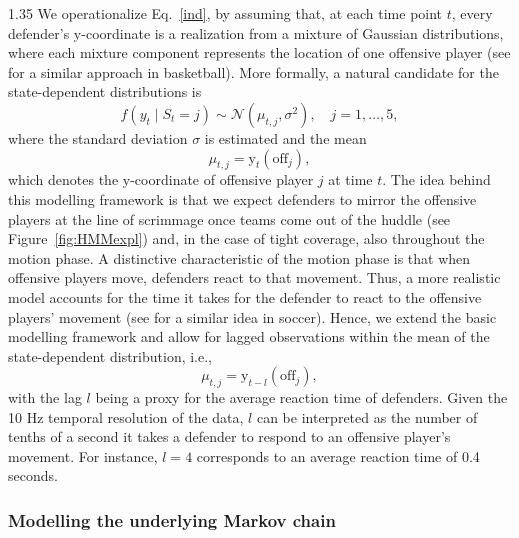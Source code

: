 \documentclass[12pt,a4paper]{article}
\begin{document}
\begin{spacing}{1.35}
We operationalize Eq.~\ref{ind}, by assuming that, at each time point $t$, every defender's $\mathrm{y}$-coordinate is a realization from a mixture of Gaussian distributions, where each mixture component represents the location of one offensive player (see \citealp{franks2015} for a similar approach in basketball). 
More formally, a natural candidate for the state-dependent distributions is
\begin{equation}
\label{eqn:state_dep}
  f(y_t \mid S_t = j) \sim \mathcal{N}(\mu_{t,j}, \sigma^2), \quad j = 1, \ldots, 5,  
\end{equation}
where the standard deviation $\sigma$ is estimated and the mean
$$\mu_{t,j} = \mathrm{y}_t(\text{off}_j),$$ 
which denotes the $\mathrm{y}$-coordinate of offensive player $j$ at time $t$. The idea behind this modelling framework is that we expect defenders to mirror the offensive players at the line of scrimmage once teams come out of the huddle (see Figure~\ref{fig:HMMexpl}) and, in the case of tight coverage, also throughout the motion phase. 
A distinctive characteristic of the motion phase is that when offensive players move, defenders react to that movement. Thus, a more realistic model accounts for the time it takes for the defender to react to the offensive players' movement (see \citealp{wu2023evaluation} for a similar idea in soccer). Hence, we extend the basic modelling framework and allow for lagged observations within the mean of the state-dependent distribution, i.e., 
\begin{equation}\label{eq:lag}    
\mu_{t,j} = \mathrm{y}_{t-l}(\text{off}_j),
\end{equation}
with the lag $l$ being a proxy for the average reaction time of defenders. 
Given the 10 Hz temporal resolution of the data, $l$ can be interpreted as the number of tenths of a second it takes a defender to respond to an offensive player’s movement. For instance, $l = 4$ corresponds to an average reaction time of 0.4 seconds.

\subsubsection{Modelling the underlying Markov chain}
\label{sec:MC_dets}


\end{spacing}
\end{document}

